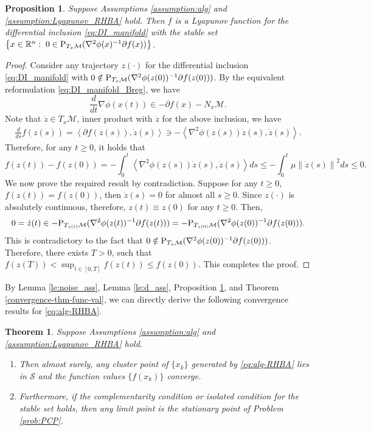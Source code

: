 \documentclass[11pt]{article}
\newcommand{\R}{\mathbb R}
\newcommand{\cM}{\mathcal M}
\newcommand{\cS}{\mathcal S}
\def\norm#1{\left\|#1\right\|}
\def\inner#1{\left\langle#1\right\rangle}
\newtheorem{theorem}{Theorem}[section]
\newtheorem{proposition}{Proposition}[section]
\begin{document}
\begin{proposition}
\label{prop:Lyapunov_RHBA}
Suppose Assumptions \ref{assumption:alg} and \ref{assumption:Lyapunov_RHBA} hold. Then $f$ is a Lyapunov function for the differential inclusion \eqref{eq:DI_manifold} with the stable set $\left\{x\in\R^n:\;0\in{\rm P}_{T_x\cM}(\nabla^2\phi(x)^{-1}\partial f(x))\right\}$.
\end{proposition}
\begin{proof}
Consider any trajectory $z(\cdot)$ for the differential inclusion \eqref{eq:DI_manifold} with $0\notin{\rm P}_{T_x\cM}(\nabla^2\phi(z(0))^{-1}\partial f(z(0)))$. By the equivalent reformulation \eqref{eq:DI_manifold_Breg}, we have
\[
\frac{d}{dt}\nabla\phi(x(t))\in-\partial f(x)-N_x\cM.
\]
Note that $\dot z\in T_x\cM$, inner product with $\dot z$ for the above inclusion, we have
\[
\begin{aligned}
\frac{d}{ds}f(z(s))=\inner{\partial f(z(s)),\dot z(s)}\ni-\inner{\nabla^2\phi(z(s))\dot z(s),\dot z(s)}.
\end{aligned}
\]
Therefore, for any $t\geq0$, it holds that
\[
f(z(t))-f(z(0))=-\int_0^t\inner{\nabla^2\phi(z(s))\dot z(s),\dot z(s)}ds\leq-\int_0^t\mu\norm{\dot z(s)}^2ds\leq0.
\]
We now prove the required result by contradiction. Suppose for any $t\geq0$, $f(z(t))=f(z(0))$, then $\dot z(s)=0$ for almost all $s\geq0$. Since $z(\cdot)$ is absolutely continuous, therefore, $z(t)\equiv z(0)$ for any $t\geq0$. Then, 
\[
0=\dot z(t)\in-{\rm P}_{T_{z(t)}\cM}(\nabla^2\phi(z(t))^{-1}\partial f(z(t)))=-{\rm P}_{T_{z(0)}\cM}(\nabla^2\phi(z(0))^{-1}\partial f(z(0))).
\]
This is contradictory to the fact that $0\notin{\rm P}_{T_x\cM}(\nabla^2\phi(z(0))^{-1}\partial f(z(0)))$. Therefore, there exists $T>0$, such that $f(z(T))<\sup_{t\in[0,T]}f(z(t))\leq f(z(0))$. This completes the proof.
\end{proof}

By Lemma \ref{le:noise_ass}, Lemma \ref{le:d_ass}, Proposition \ref{prop:Lyapunov_RHBA}, and Theorem \ref{convergence-thm-func-val}, we can directly derive the following convergence results for \eqref{eq:alg-RHBA}.
\begin{theorem}
    \label{thm:BGD}
    Suppose Assumptions \ref{assumption:alg} and \ref{assumption:Lyapunov_RHBA} hold. 
    \begin{enumerate}
        \item Then almost surely, any cluster point of $\{x_k\}$ generated by \eqref{eq:alg-RHBA} lies in $\cS$ and the function values $\{f(x_k)\}$ converge. 
        \item Furthermore, if the complementarity condition or isolated condition for the stable set holds, then any limit point is the stationary point of Problem \eqref{prob:PCP}.
    \end{enumerate}
\end{theorem}
\end{document}
